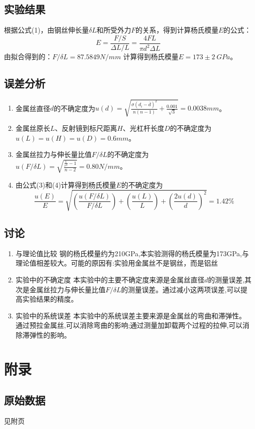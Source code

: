 \documentclass[UTF8]{ctexart}
\begin{document}
\subsection{实验结果}
根据公式(1)，由钢丝伸长量$\delta L$和所受外力$F$的关系，得到计算杨氏模量$E$的公式：
\begin{equation}
    E=\frac{F/S}{\Delta L/L}=\frac{4FL}{\pi d^2 \Delta L}
\end{equation}
由拟合得到的：$F/\delta L= 87.5849 N/mm$
计算得到杨氏模量$E=173 \pm 2 \ GPa$。
\subsection{误差分析}
\begin{enumerate}
    \item 金属丝直径$d$的不确定度为$u(d)=\sqrt{\frac{\sigma(d_i-\bar{d})^2}{n(n-1)}+\frac{0.001}{\sqrt{3}}}=0.0038mm$。
    \item 金属丝原长$L$、反射镜到标尺距离$H$、光杠杆长度$D$的不确定度为$u(L)=u(H)=u(D)=0.6mm$。
    \item 金属丝拉力与伸长量比值$F/\delta L$的不确定度为$u(F/\delta L)=\sqrt{\frac{\frac{1}{r^2}-1}{n-2}}=0.80N/mm$。
    \item 由公式(3)和(4)计算得到杨氏模量$E$的不确定度为
    \begin{equation}
    \frac{u(E)}{E}=\sqrt{(\frac{u(F/ \delta L)}{F/ \delta L})+(\frac{u(L)}{L})+(\frac{2u(d)}{d})^2}=1.42\%
    \end{equation}
\end{enumerate}
\subsection{讨论}
\begin{enumerate}
    \item 与理论值比较
    钢的杨氏模量约为210GPa,本实验测得的杨氏模量为173GPa,与理论值相差较大。可能的原因有:实验用金属丝不是钢丝，而是铝丝
    \item 实验中的不确定度
    本实验中的主要不确定度来源是金属丝直径$d$的测量误差,其次是金属丝拉力与伸长量比值$F/\delta L$的测量误差。通过减小这两项误差,可以提高实验结果的精度。
    \item 实验中的系统误差
    本实验中的系统误差主要来源是金属丝的弯曲和滞弹性。通过预拉金属丝,可以消除弯曲的影响;通过测量加卸载两个过程的拉伸,可以消除滞弹性的影响。
\end{enumerate}
\section{附录}
\subsection{原始数据}
见附页
\end{document}
